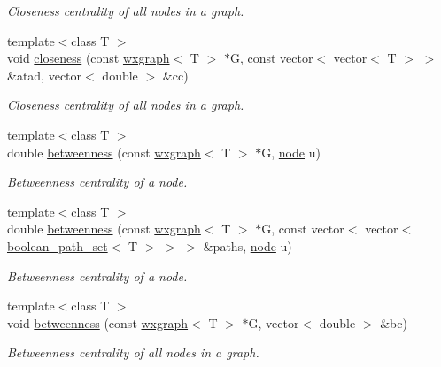 \begin{DoxyCompactItemize}
\begin{DoxyCompactList}\small\item\em Closeness centrality of all nodes in a graph. \end{DoxyCompactList}\item 
{\footnotesize template$<$class T $>$ }\\void \hyperlink{namespacelgraph_1_1networks_1_1metrics_1_1centralities_af807c15c31f07d267798cc959fc61dca}{closeness} (const \hyperlink{classlgraph_1_1utils_1_1wxgraph}{wxgraph}$<$ T $>$ $\ast$G, const vector$<$ vector$<$ T $>$ $>$ \&atad, vector$<$ double $>$ \&cc)
\begin{DoxyCompactList}\small\item\em Closeness centrality of all nodes in a graph. \end{DoxyCompactList}\item 
{\footnotesize template$<$class T $>$ }\\double \hyperlink{namespacelgraph_1_1networks_1_1metrics_1_1centralities_a5a8a94d9361a49ffa657d8d6541be4be}{betweenness} (const \hyperlink{classlgraph_1_1utils_1_1wxgraph}{wxgraph}$<$ T $>$ $\ast$G, \hyperlink{namespacelgraph_1_1utils_a7bd66ede3805ef121bc2835bd48de0cf}{node} u)
\begin{DoxyCompactList}\small\item\em Betweenness centrality of a node. \end{DoxyCompactList}\item 
{\footnotesize template$<$class T $>$ }\\double \hyperlink{namespacelgraph_1_1networks_1_1metrics_1_1centralities_a04383a2788cd6a602e390b08f06099a3}{betweenness} (const \hyperlink{classlgraph_1_1utils_1_1wxgraph}{wxgraph}$<$ T $>$ $\ast$G, const vector$<$ vector$<$ \hyperlink{namespacelgraph_1_1utils_aaf50131e15d771a45620336d6e7a77f8}{boolean\+\_\+path\+\_\+set}$<$ T $>$ $>$ $>$ \&paths, \hyperlink{namespacelgraph_1_1utils_a7bd66ede3805ef121bc2835bd48de0cf}{node} u)
\begin{DoxyCompactList}\small\item\em Betweenness centrality of a node. \end{DoxyCompactList}\item 
{\footnotesize template$<$class T $>$ }\\void \hyperlink{namespacelgraph_1_1networks_1_1metrics_1_1centralities_a32fb8a20727fbc27a7226361bfd5aee2}{betweenness} (const \hyperlink{classlgraph_1_1utils_1_1wxgraph}{wxgraph}$<$ T $>$ $\ast$G, vector$<$ double $>$ \&bc)
\begin{DoxyCompactList}\small\item\em Betweenness centrality of all nodes in a graph. \end{DoxyCompactList}\item 

\end{DoxyCompactItemize}
